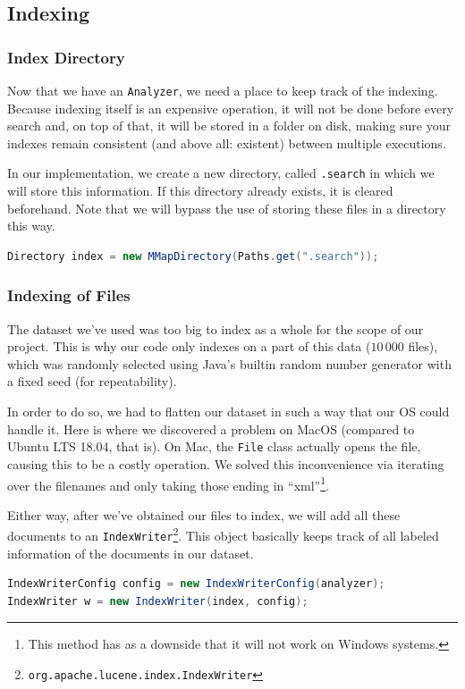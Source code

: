 \documentclass[11pt]{article}
\begin{document}
\subsection{Indexing}\label{sec:indexing}
\subsubsection{Index Directory}
Now that we have an \texttt{Analyzer}, we need a place to keep track of the indexing. Because indexing itself is an expensive operation, it will not be done before every search and, on top of that, it will be stored in a folder on disk, making sure your indexes remain consistent (and above all: existent) between multiple executions.

In our implementation, we create a new directory, called \texttt{.search} in which we will store this information. If this directory already exists, it is cleared beforehand. Note that we will bypass the use of storing these files in a directory this way.
\begin{lstlisting}[language=Java]
Directory index = new MMapDirectory(Paths.get(".search"));
\end{lstlisting}

\subsubsection{Indexing of Files}\label{sec:indexfiles}
The dataset we've used was too big to index as a whole for the scope of our project. This is why our code only indexes on a part of this data ($10\,000$ files), which was randomly selected using Java's builtin random number generator with a fixed seed (for repeatability).

In order to do so, we had to flatten our dataset in such a way that our OS could handle it. Here is where we discovered a problem on MacOS (compared to Ubuntu LTS 18.04, that is). On Mac, the \texttt{File} class actually opens the file, causing this to be a costly operation. We solved this inconvenience via iterating over the filenames and only taking those ending in ``xml''\footnote{This method has as a downside that it will not work on Windows systems.}.

Either way, after we've obtained our files to index, we will add all these documents to an \texttt{IndexWriter}\footnote{\texttt{org.apache.lucene.index.IndexWriter}}. This object basically keeps track of all labeled information of the documents in our dataset.
\begin{lstlisting}[language=Java]
IndexWriterConfig config = new IndexWriterConfig(analyzer);
IndexWriter w = new IndexWriter(index, config);
\end{lstlisting}
\end{document}
